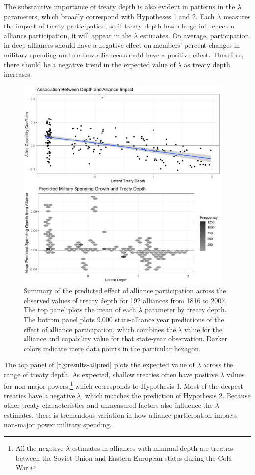 \documentclass[12pt]{article}
\begin{document}
The substantive importance of treaty depth is also evident in patterns in the $\lambda$ parameters, which broadly correspond with Hypotheses 1 and 2. 
Each $\lambda$ measures the impact of treaty participation, so if treaty depth has a large influence on alliance participation, it will appear in the $\lambda$ estimates. 
On average, participation in deep alliances should have a negative effect on members' percent changes in military spending and shallow alliances should have a positive effect.
Therefore, there should be a negative trend in the expected value of $\lambda$ as treaty depth increases.


\begin{figure}[htbp]
	\centering
		\includegraphics[width=0.95\textwidth]{../figures/results-allpred.png}
	\caption{Summary of the predicted effect of alliance participation across the observed values of treaty depth for 192 alliances from 1816 to 2007. The top panel plots the mean of each $\lambda$ parameter by treaty depth. The bottom panel plots 9,000 state-alliance year predictions of the effect of alliance participation, which combines the $\lambda$ value for the alliance and capability value for that state-year observation. Darker colors indicate more data points in the particular hexagon.}
	\label{fig:results-allpred}
\end{figure}


The top panel of \autoref{fig:results-allpred} plots the expected value of $\lambda$ across the range of treaty depth. 
As expected, shallow treaties often have positive $\lambda$ values for non-major powers,\footnote{All the negative $\lambda$ estimates in alliances with minimal depth are treaties between the Soviet Union and Eastern European states during the Cold War.} which corresponds to Hypothesis 1. 
Most of the deepest treaties have a negative $\lambda$, which matches the prediction of Hypothesis 2. 
Because other treaty characteristics and unmeasured factors also influence the $\lambda$ estimates, there is tremendous variation in how alliance participation impacts non-major power military spending. 
\end{document}
